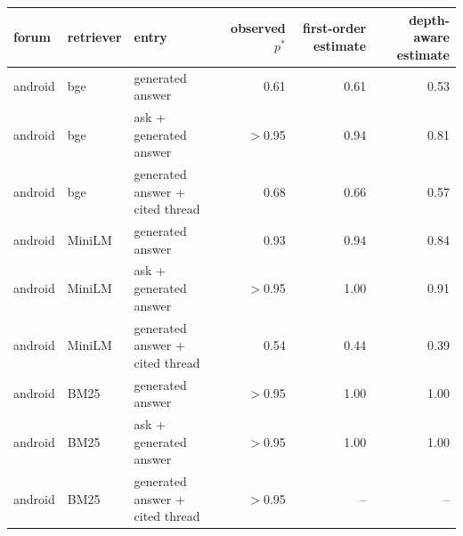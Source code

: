 \begin{tabular}{lllrrr}
\toprule
forum & retriever & entry & observed $p^*$ & first-order estimate & depth-aware estimate \\
\midrule
android & bge & generated answer & 0.61 & 0.61 & 0.53 \\
android & bge & ask + generated answer & $>$0.95 & 0.94 & 0.81 \\
android & bge & generated answer + cited thread & 0.68 & 0.66 & 0.57 \\
\midrule
android & MiniLM & generated answer & 0.93 & 0.94 & 0.84 \\
android & MiniLM & ask + generated answer & $>$0.95 & 1.00 & 0.91 \\
android & MiniLM & generated answer + cited thread & 0.54 & 0.44 & 0.39 \\
\midrule
android & BM25 & generated answer & $>$0.95 & 1.00 & 1.00 \\
android & BM25 & ask + generated answer & $>$0.95 & 1.00 & 1.00 \\
android & BM25 & generated answer + cited thread & $>$0.95 & -- & -- \\
\bottomrule
\end{tabular}
